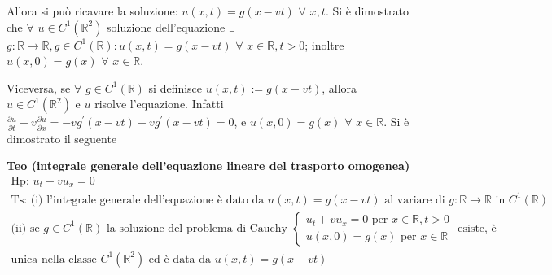 \documentclass{article}
\begin{document}
Allora si pu\`{o} ricavare la soluzione: $u\left( x,t\right) =g\left(
x-vt\right) $ $\forall $ $x,t$. Si \`{e} dimostrato che $\forall $ $u\in
C^{1}\left( 
\mathbb{R}
^{2}\right) $ soluzione dell'equazione $\exists $ $g:%
\mathbb{R}
\rightarrow 
\mathbb{R}
,g\in C^{1}\left( 
\mathbb{R}
\right) :u\left( x,t\right) =g\left( x-vt\right) $ $\forall $ $x\in 
\mathbb{R}
,t>0$; inoltre $u\left( x,0\right) =g\left( x\right) $ $\forall $ $x\in 
\mathbb{R}
$.

Viceversa, se $\forall $ $g\in C^{1}\left( 
\mathbb{R}
\right) $ si definisce $u\left( x,t\right) :=g\left( x-vt\right) $, allora $%
u\in C^{1}\left( 
\mathbb{R}
^{2}\right) $ e $u$ risolve l'equazione. Infatti $\frac{\partial u}{\partial
t}+v\frac{\partial u}{\partial x}=-vg^{\prime }\left( x-vt\right)
+vg^{\prime }\left( x-vt\right) =0$, e $u\left( x,0\right) =g\left( x\right) 
$ $\forall $ $x\in 
\mathbb{R}
$. Si \`{e} dimostrato il seguente

\textbf{Teo (integrale generale dell'equazione lineare del trasporto
omogenea)}%
\begin{gather*}
\text{Hp: }u_{t}+vu_{x}=0 \\
\text{Ts: (i) l'integrale generale dell'equazione \`{e} dato da }u\left(
x,t\right) =g\left( x-vt\right) \text{ al variare di }g:%
\mathbb{R}
\rightarrow 
\mathbb{R}
\text{ in }C^{1}\left( 
\mathbb{R}
\right) \\
\text{(ii) se }g\in C^{1}\left( 
\mathbb{R}
\right) \text{ la soluzione del problema di Cauchy }\left\{ 
\begin{array}{c}
u_{t}+vu_{x}=0\text{ per }x\in 
\mathbb{R}
,t>0 \\ 
u\left( x,0\right) =g\left( x\right) \text{ per }x\in 
\mathbb{R}%
\end{array}%
\right. \text{ esiste, \`{e}} \\
\text{unica nella classe }C^{1}\left( 
\mathbb{R}
^{2}\right) \text{ ed \`{e} data da }u\left( x,t\right) =g\left( x-vt\right)
\end{gather*}
\end{document}
